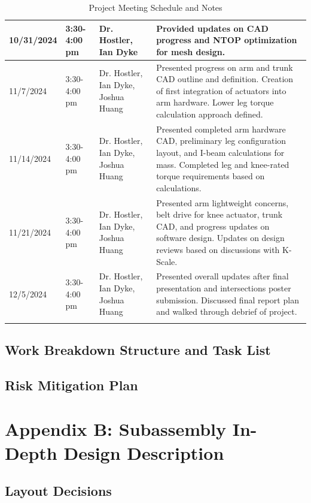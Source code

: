 \documentclass{article}
\begin{document}
\begin{longtable}{|>{\raggedright}m{2.5cm}|>{\raggedright}m{2.5cm}|>{\raggedright}m{4cm}|>{\raggedright\arraybackslash}m{6cm}|}
10/31/2024 & 3:30-4:00 pm & Dr. Hostler, Ian Dyke & Provided updates on CAD progress and NTOP optimization for mesh design. \\ \hline
11/7/2024 & 3:30-4:00 pm & Dr. Hostler, Ian Dyke, Joshua Huang & Presented progress on arm and trunk CAD outline and definition. Creation of first integration of actuators into arm hardware. Lower leg torque calculation approach defined. \\ \hline
11/14/2024 & 3:30-4:00 pm & Dr. Hostler, Ian Dyke, Joshua Huang & Presented completed arm hardware CAD, preliminary leg configuration layout, and I-beam calculations for mass. Completed leg and knee-rated torque requirements based on calculations. \\ \hline
11/21/2024 & 3:30-4:00 pm & Dr. Hostler, Ian Dyke, Joshua Huang & Presented arm lightweight concerns, belt drive for knee actuator, trunk CAD, and progress updates on software design. Updates on design reviews based on discussions with K-Scale. \\ \hline
12/5/2024 & 3:30-4:00 pm & Dr. Hostler, Ian Dyke, Joshua Huang & Presented overall updates after final presentation and intersections poster submission. Discussed final report plan and walked through debrief of project. \\ \hline
\caption{Project Meeting Schedule and Notes}
\label{tab:meetings}
\end{longtable}

\subsection{Work Breakdown Structure and Task List}

\newpage

\subsection{Risk Mitigation Plan}

\newpage

\section{Appendix B: Subassembly In-Depth Design Description}

\subsection{Layout Decisions}
\end{document}
